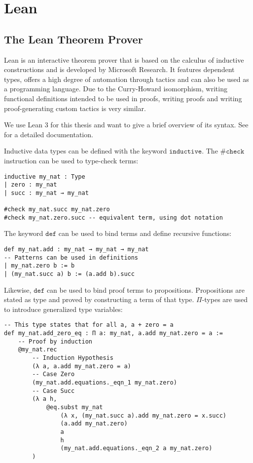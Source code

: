 \clearpage

\section{Lean}

\subsection{The Lean Theorem Prover}

Lean is an interactive theorem prover that is based on the calculus of inductive constructions \cite{leanWebsite} \cite{moura15} and is developed by Microsoft Research.
It features dependent types, offers a high degree of automation through tactics and can also be used as a programming language.
Due to the Curry-Howard isomorphism, writing functional definitions intended to be used in proofs,
writing proofs and writing proof-generating custom tactics is very similar.

We use Lean 3 for this thesis and want to give a brief overview of its syntax. See \cite{leanDocs} for a detailed documentation.

Inductive data types can be defined with the keyword $\mathtt{inductive}$. The $\mathtt{\#check}$ instruction can be used to type-check terms:
\begin{verbatim}
inductive my_nat : Type
| zero : my_nat
| succ : my_nat → my_nat

#check my_nat.succ my_nat.zero
#check my_nat.zero.succ -- equivalent term, using dot notation
\end{verbatim}

The keyword $\mathtt{def}$ can be used to bind terms and define recursive functions:
\begin{verbatim}
def my_nat.add : my_nat → my_nat → my_nat
-- Patterns can be used in definitions
| my_nat.zero b := b
| (my_nat.succ a) b := (a.add b).succ
\end{verbatim}

Likewise, $\mathtt{def}$ can be used to bind proof terms to propositions.
Propositions are stated as type and proved by constructing a term of that type.
$\Pi$-types are used to introduce generalized type variables:
\begin{verbatim}
-- This type states that for all a, a + zero = a
def my_nat.add_zero_eq : Π a: my_nat, a.add my_nat.zero = a :=
    -- Proof by induction
    @my_nat.rec
        -- Induction Hypothesis
        (λ a, a.add my_nat.zero = a)
        -- Case Zero
        (my_nat.add.equations._eqn_1 my_nat.zero)
        -- Case Succ
        (λ a h,
            @eq.subst my_nat
                (λ x, (my_nat.succ a).add my_nat.zero = x.succ)
                (a.add my_nat.zero)
                a
                h
                (my_nat.add.equations._eqn_2 a my_nat.zero)
        )
\end{verbatim}

